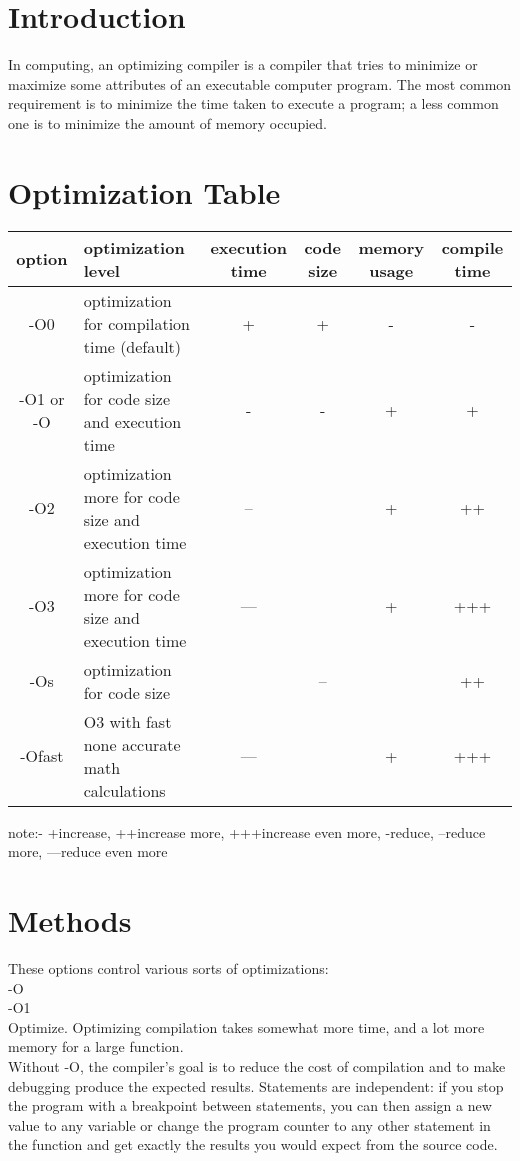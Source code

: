 \documentclass{sem5}
\author{Hemant Kumar}
\begin{document}
\section*{Introduction}
In computing, an optimizing compiler is a compiler that tries to minimize or maximize some attributes of an executable computer program. The most common requirement is to minimize the time taken to execute a program; a less common one is to minimize the amount of memory occupied.

\section*{Optimization Table}
\begin{tabular}{|c|p{5cm}|c|c|c|c|}
\hline
option& 	optimization level& 	execution time& 	code size& 	memory usage & compile time\\
\hline
-O0 	&optimization for compilation time (default) &	+ &	+& 	-& 	-\\
\hline
-O1 or -O &	optimization for code size and execution time 	&- &	-& 	+& 	+\\
\hline
-O2& 	optimization more for code size and execution time& 	-- 	  &	&+ &	++\\
\hline
-O3 &	optimization more for code size and execution time &	--- 	&  	&+ 	&+++\\
\hline
-Os 	&optimization for code size 	  &&	-- &&	  	++\\
\hline
-Ofast 	&O3 with fast none accurate math calculations &	--- &&	  	+ &	+++\\
\hline
\end{tabular}


note:- +increase, ++increase more, +++increase even more, -reduce, --reduce more, ---reduce even more
\section*{Methods}
These options control various sorts of optimizations:\\
-O\\
-O1\\
Optimize. Optimizing compilation takes somewhat more time, and a lot more memory for a large function.\\
Without -O, the compiler's goal is to reduce the cost of compilation and to make debugging produce the expected results. Statements are independent: if you stop the program with a breakpoint between statements, you can then assign a new value to any variable or change the program counter to any other statement in the function and get exactly the results you would expect from the source code.\\
\end{document}
